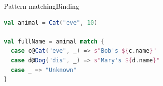 \documentclass[aspectratio=169]{beamer}
\begin{document}
\begin{frame}[fragile]{Pattern matching}{Binding}
\begin{lstlisting}[style=scala,language=scala]
val animal = Cat("eve", 10)

val fullName = animal match {
  case c@Cat("eve", _) => s"Bob's ${c.name}"
  case d@Dog("dis", _) => s"Mary's ${d.name}"
  case _ => "Unknown"
}
\end{lstlisting}
\end{frame}




\end{document}
